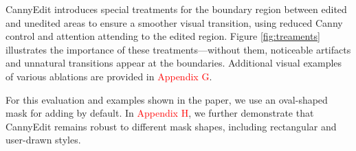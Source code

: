 \documentclass{article}
\begin{document}

CannyEdit introduces special treatments for the boundary region between edited and unedited areas to ensure a smoother visual transition, using reduced Canny control and attention attending to the edited region. Figure \ref{fig:treaments} illustrates the importance of these treatments—without them, noticeable artifacts and unnatural transitions appear at the boundaries. Additional visual examples of various ablations are provided in \textcolor{red}{Appendix G}.

For this evaluation and examples shown in the paper, we use an oval-shaped mask for adding by default. In \textcolor{red}{Appendix H}, we further demonstrate that CannyEdit remains robust to different mask shapes, including rectangular and user-drawn styles.
\end{document}
